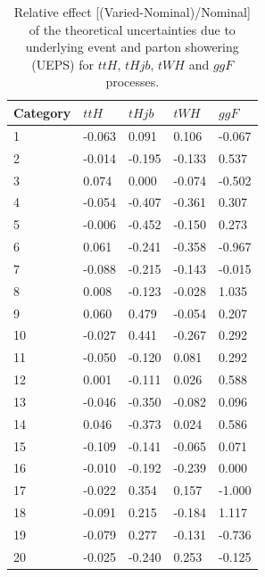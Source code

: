 \begin{table}[ht]
\begin{center}
\begin{tabular}{lllll}
Category & $ttH$ & $tHjb$ & $tWH$ & $ggF$ \\ \hline
1  &       -0.063 &         0.091 &        0.106 &    -0.067 \\
2  &       -0.014 &        -0.195 &       -0.133 &     0.537 \\
3  &        0.074 &         0.000 &       -0.074 &    -0.502 \\
4  &       -0.054 &        -0.407 &       -0.361 &     0.307 \\
5  &       -0.006 &        -0.452 &       -0.150 &     0.273 \\
6  &        0.061 &        -0.241 &       -0.358 &    -0.967 \\
7  &       -0.088 &        -0.215 &       -0.143 &    -0.015 \\
8  &        0.008 &        -0.123 &       -0.028 &     1.035 \\
9  &        0.060 &         0.479 &       -0.054 &     0.207 \\
10 &       -0.027 &         0.441 &       -0.267 &     0.292 \\
11 &       -0.050 &        -0.120 &        0.081 &     0.292 \\
12 &        0.001 &        -0.111 &        0.026 &     0.588 \\ \hline
13 &       -0.046 &        -0.350 &       -0.082 &     0.096 \\
14 &        0.046 &        -0.373 &        0.024 &     0.586 \\
15 &       -0.109 &        -0.141 &       -0.065 &     0.071 \\
16 &       -0.010 &        -0.192 &       -0.239 &     0.000 \\
17 &       -0.022 &         0.354 &        0.157 &    -1.000 \\
18 &       -0.091 &         0.215 &       -0.184 &     1.117 \\
19 &       -0.079 &         0.277 &       -0.131 &    -0.736 \\
20 &       -0.025 &        -0.240 &        0.253 &    -0.125 \\ \hline
\hline
\end{tabular}
\end{center}
\vspace{-0.5cm}
\caption{Relative effect [(Varied-Nominal)/Nominal] of the theoretical uncertainties due to underlying event and parton showering (UEPS) for $ttH$, $tHjb$, $tWH$ and $ggF$ processes.}
\label{tab:ueps}
\end{table}

